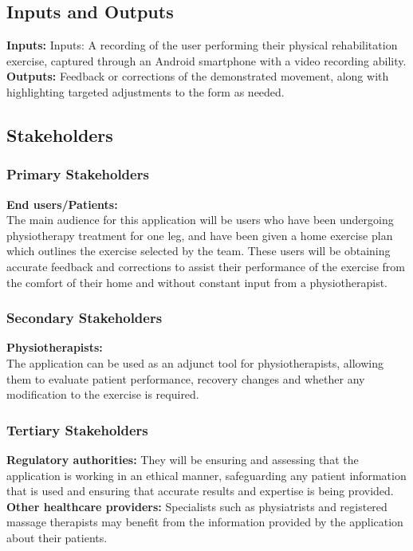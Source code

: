 \documentclass{article}
\begin{document}
\subsection{Inputs and Outputs}

\textbf{Inputs:} Inputs: A recording of the user performing their physical rehabilitation exercise, captured through an Android smartphone with a video recording ability. \\
\textbf{Outputs:} Feedback or corrections of the demonstrated movement, along with highlighting targeted adjustments to the form as needed. 

\subsection{Stakeholders}
  \subsubsection{Primary Stakeholders}
    \textbf{End users/Patients:} \\
    The main audience for this application will be users who have been undergoing physiotherapy treatment for one leg, and have been given a home exercise
    plan which outlines the exercise selected by the team. These users will be obtaining accurate feedback and corrections to assist their performance of the
    exercise from the comfort of their home and without constant input from a physiotherapist.
     
  \subsubsection{Secondary Stakeholders}
    \textbf{Physiotherapists:} \\
      The application can be used as an adjunct tool for physiotherapists, allowing them to evaluate patient performance, recovery changes and whether any modification to the exercise is required. \\
      
  \subsubsection{Tertiary Stakeholders}
    \textbf{Regulatory authorities:}
      They will be ensuring and assessing that the application is working in an ethical manner, safeguarding any patient information that is used and ensuring that accurate results and expertise is being provided. \\
    \textbf{Other healthcare providers:}
       Specialists such as physiatrists and registered massage therapists may benefit from the information provided by the application about their patients. 
\end{document}
